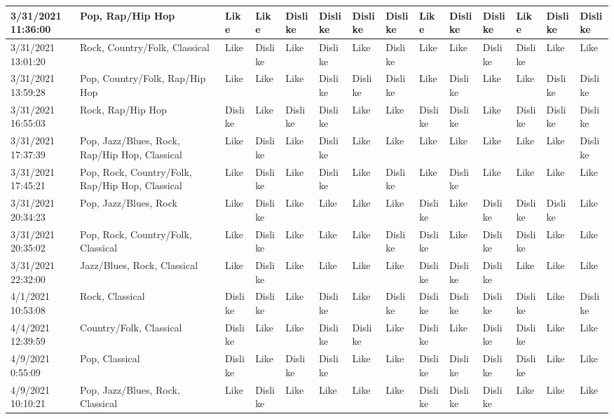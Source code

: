 \begin{table}
{\begin{tabular}{|l|l|l|l|l|l|l|l|l|l|l|l|l|l|}
        3/31/2021 11:36:00 & Pop, Rap/Hip Hop & Like & Like & Dislike & Dislike & Dislike & Dislike & Like & Dislike & Dislike & Like & Dislike & Dislike \\ \hline
        3/31/2021 13:01:20 & Rock, Country/Folk, Classical & Like & Dislike & Like & Dislike & Like & Dislike & Like & Like & Dislike & Dislike & Like & Like \\ \hline
        3/31/2021 13:59:28 & Pop, Country/Folk, Rap/Hip Hop & Like & Like & Like & Dislike & Dislike & Dislike & Like & Dislike & Like & Like & Dislike & Dislike \\ \hline
        3/31/2021 16:55:03 & Rock, Rap/Hip Hop & Dislike & Like & Dislike & Dislike & Like & Like & Dislike & Dislike & Like & Dislike & Dislike & Dislike \\ \hline
        3/31/2021 17:37:39 & Pop, Jazz/Blues, Rock, Rap/Hip Hop, Classical & Like & Dislike & Like & Dislike & Like & Like & Like & Like & Like & Like & Like & Dislike \\ \hline
        3/31/2021 17:45:21 & Pop, Rock, Country/Folk, Rap/Hip Hop, Classical & Like & Dislike & Like & Dislike & Like & Dislike & Like & Dislike & Like & Like & Like & Like \\ \hline
        3/31/2021 20:34:23 & Pop, Jazz/Blues, Rock & Like & Dislike & Like & Like & Like & Like & Dislike & Like & Dislike & Dislike & Dislike & Like \\ \hline
        3/31/2021 20:35:02 & Pop, Rock, Country/Folk, Classical & Like & Dislike & Like & Like & Like & Dislike & Dislike & Like & Dislike & Dislike & Like & Like \\ \hline
        3/31/2021 22:32:00 & Jazz/Blues, Rock, Classical & Like & Dislike & Like & Like & Like & Like & Dislike & Dislike & Dislike & Like & Like & Like \\ \hline
        4/1/2021 10:53:08 & Rock, Classical & Dislike & Dislike & Like & Dislike & Like & Dislike & Dislike & Dislike & Dislike & Dislike & Like & Dislike \\ \hline
        4/4/2021 12:39:59 & Country/Folk, Classical & Dislike & Like & Like & Dislike & Dislike & Like & Dislike & Like & Dislike & Dislike & Like & Like \\ \hline
        4/9/2021 0:55:09 & Pop, Classical & Dislike & Like & Dislike & Dislike & Like & Like & Dislike & Dislike & Dislike & Dislike & Like & Like \\ \hline
        4/9/2021 10:10:21 & Pop, Jazz/Blues, Rock, Classical & Like & Dislike & Like & Like & Like & Like & Dislike & Dislike & Dislike & Like & Like & Like \\ \hline

\end{tabular}}
\end{table}
